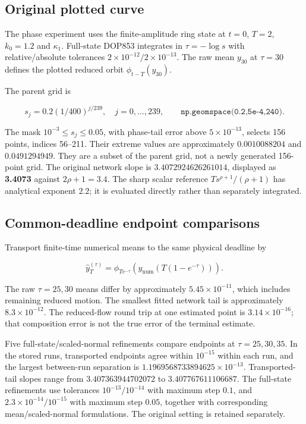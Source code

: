 \documentclass[11pt,a4paper]{article}
\begin{document}
\subsection{Original plotted curve}\label{c05-original}

The phase experiment uses the finite-amplitude ring state at \(t=0\),
\(T=2\), \(k_0=1.2\) and \(\kappa_1\). Full-state DOP853 integrates in
\(\tau=-\log s\) with relative/absolute tolerances
\(2\times10^{-12}/2\times10^{-13}\). The raw mean \(y_{30}\) at
\(\tau=30\) defines the plotted reduced orbit \(\phi_{t-T}(y_{30})\).

The parent grid is

\[
s_j=0.2(1/400)^{j/239},\quad j=0,\ldots,239,
\qquad \texttt{np.geomspace(0.2,5e-4,240)}. \tag{E06}
\]

The mask \(10^{-3}\leq s_j\leq0.05\), with phase-tail error above
\(5\times10^{-13}\), selects 156 points, indices 56--211. Their extreme
values are approximately \(0.0010088204\) and \(0.0491294949\). They are
a subset of the parent grid, not a newly generated 156-point grid. The
original network slope is \(3.4072924626261014\), displayed as
\textbf{3.4073} against \(2\rho+1=3.4\). The sharp scalar reference
\(Ts^{\rho+1}/(\rho+1)\) has analytical exponent \(2.2\); it is
evaluated directly rather than separately integrated.

\subsection{Common-deadline endpoint comparisons}\label{c05-transport}

Transport finite-time numerical means to the same physical deadline by

\[
\widehat y_T^{(\tau)}=\phi_{Te^{-\tau}}\!\left(y_{\mathrm{num}}(T(1-e^{-\tau}))\right).
\]

The raw \(\tau=25,30\) means differ by approximately
\(5.45\times10^{-11}\), which includes remaining reduced motion. The
smallest fitted network tail is approximately \(8.3\times10^{-12}\). The
reduced-flow round trip at one estimated point is
\(3.14\times10^{-16}\); that composition error is not the true error of
the terminal estimate.

Five full-state/scaled-normal refinements compare endpoints at
\(\tau=25,30,35\). In the stored runs, transported endpoints agree
within \(10^{-15}\) within each run, and the largest between-run
separation is \(1.1969568733894625\times10^{-13}\). Transported-tail
slopes range from \(3.407363944702072\) to \(3.407767611106687\). The
full-state refinements use tolerances \(10^{-13}/10^{-14}\) with maximum
step \(0.1\), and \(2.3\times10^{-14}/10^{-15}\) with maximum step
\(0.05\), together with corresponding mean/scaled-normal formulations.
The original setting is retained separately.
\end{document}
